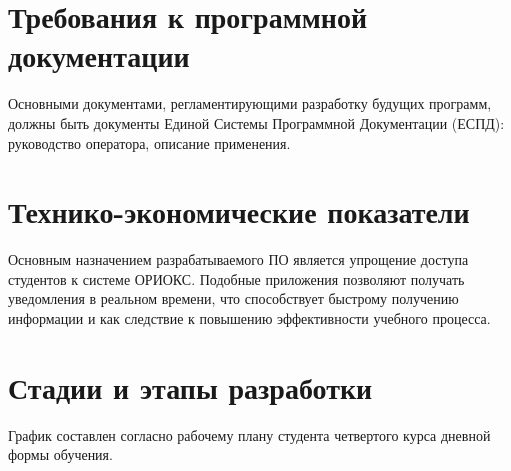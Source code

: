 \vspace{0.75cm}
\chapter{Требования к программной документации}
\label{ch:docsRqmts}
Основными  документами,  регламентирующими  разработку  будущих  программ, должны  быть  документы  Единой  Системы  Программной  Документации  (ЕСПД): руководство оператора, описание применения.

\vspace{0.75cm}
\chapter{Технико-экономические показатели}
\label{ch:techEconomy}
Основным назначением разрабатываемого ПО является упрощение доступа студентов к системе ОРИОКС.
Подобные приложения позволяют получать уведомления в реальном времени, что способствует быстрому получению информации и как следствие к повышению эффективности учебного процесса.

\vspace{0.75cm}
\chapter{Стадии и этапы разработки}
\label{ch:stages}
График составлен  согласно  рабочему  плану студента  четвертого  курса  дневной  формы обучения.

